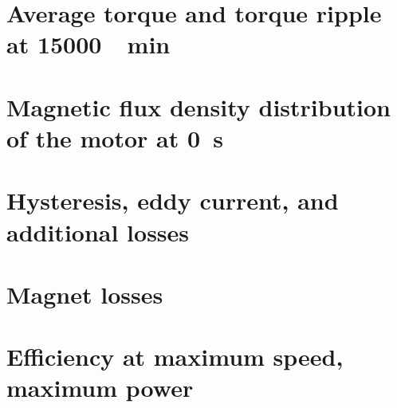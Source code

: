 \newpage

\section{Average torque and torque ripple at \SI{15000}{\per\minute}}

\section{Magnetic flux density distribution of the motor at \SI{0}{\second}}

\section{Hysteresis, eddy current, and additional losses}

\section{Magnet losses}

\section{Efficiency at maximum speed, maximum power}

\newpage
